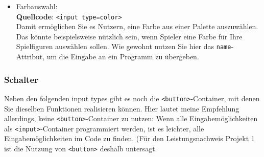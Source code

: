 \begin{itemize}
	\item Farbauswahl:\\

	\textbf{Quellcode}: \verb|<input type=color>|\\

	Damit ermöglichen Sie es Nutzern, eine Farbe aus einer Palette auszuwählen. Das könnte beispielsweise nützlich sein, wenn Spieler eine Farbe für Ihre Spielfiguren auswählen sollen. Wie gewohnt nutzen Sie hier das \verb|name|-Attribut, um die Eingabe an ein Programm zu übergeben. 
\end{itemize}


\subsubsection{Schalter}

Neben den folgenden input types gibt es noch die \verb|<button>|-Container, mit denen Sie dieselben Funktionen realisieren können. Hier lautet meine Empfehlung allerdings, keine \verb|<button>|-Container zu nutzen: Wenn alle Eingabemöglichkeiten als \verb|<input>|-Container programmiert werden, ist es leichter, alle Eingabemöglichkeiten im Code zu finden. (Für den Leistungsnachweis \glqq{}Projekt 1\grqq{} ist die Nutzung von \verb|<button>| deshalb untersagt.\\

